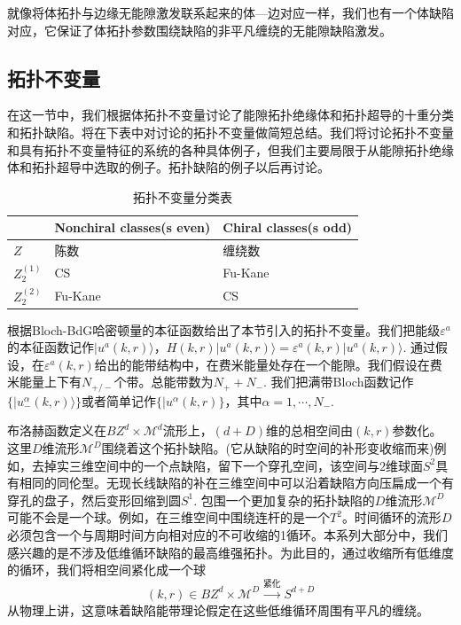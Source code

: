 \documentclass{article}
\numberwithin{equation}{subsection}
\newcommand{\mM}{\mathcal{M}}
\begin{document}
就像将体拓扑与边缘无能隙激发联系起来的体—边对应一样，我们也有一个体缺陷对应，它保证了体拓扑参数围绕缺陷的非平凡缠绕的无能隙缺陷激发。

\subsection{拓扑不变量}
在这一节中，我们根据体拓扑不变量讨论了能隙拓扑绝缘体和拓扑超导的十重分类和拓扑缺陷。将在下表中对讨论的拓扑不变量做简短总结。我们将讨论拓扑不变量和具有拓扑不变量特征的系统的各种具体例子，但我们主要局限于从能隙拓扑绝缘体和拓扑超导中选取的例子。拓扑缺陷的例子以后再讨论。

\begin{table}[h]
    \centering
    \begin{tabular}{|l|l|l|}
    \hline
                & Nonchiral classes(s even) & Chiral classes(s odd) \\ \hline
    $Z$         & 陈数                        & 缠绕数                   \\ \hline
    $Z_2^{(1)}$ & CS                        & Fu-Kane               \\ \hline
    $Z_2^{(2)}$ & Fu-Kane                   & CS                    \\ \hline
    \end{tabular}
    \caption{拓扑不变量分类表}
\end{table}

根据Bloch-BdG哈密顿量的本征函数给出了本节引入的拓扑不变量。我们把能级$\varepsilon^a$的本征函数记作$|u^a(k,r)\rangle$，$H(k,r)|u^a(k,r)\rangle=\varepsilon^a(k,r)|u^a(k,r)\rangle$. 通过假设，在$\varepsilon^a(k,r)$给出的能带结构中，在费米能量处存在一个能隙。我们假设在费米能量上下有$N_{+/-}$个带。总能带数为$N_++N_-$. 我们把满带Bloch函数记作$\{|u_-^\alpha(k,r)\rangle\}$或者简单记作$\{|u^\alpha(k,r)\}$，其中$\alpha=1,\cdots,N_-$.

布洛赫函数定义在$BZ^d\times\mathcal{M}^d$流形上，$(d+D)$维的总相空间由$(k,r)$参数化。这里$D$维流形$\mathcal{M}^D$围绕着这个拓扑缺陷。(它从缺陷的时空间的补形变收缩而来)例如，去掉实三维空间中的一个点缺陷，留下一个穿孔空间，该空间与$2$维球面$S^2$具有相同的同伦型。无现长线缺陷的补在三维空间中可以沿着缺陷方向压扁成一个有穿孔的盘子，然后变形回缩到圆$S^1$. 包围一个更加复杂的拓扑缺陷的$D$维流形$\mM^D$可能不会是一个球。例如，在三维空间中围绕连杆的是一个$T^2$。时间循环的流形$D$必须包含一个与周期时间方向相对应的不可收缩的1循环。本系列大部分中，我们感兴趣的是不涉及低维循环缺陷的最高维强拓扑。为此目的，通过收缩所有低维度的循环，我们将相空间紧化成一个球
\begin{equation*}
    (k,r)\in BZ^d\times\mM^D\xrightarrow{\text{紧化}}S^{d+D}
\end{equation*}
从物理上讲，这意味着缺陷能带理论假定在这些低维循环周围有平凡的缠绕。
\end{document}
